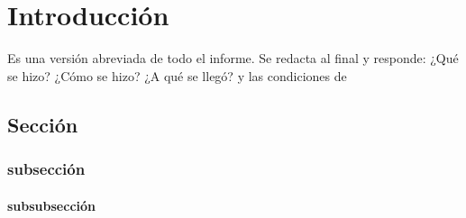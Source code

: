 \chapter{Introducción}
Es una versión abreviada de todo el informe. Se redacta al final y responde: ¿Qué se hizo? ¿Cómo se hizo? ¿A qué se llegó? y las condiciones de 
\section{Sección}
\subsection{subsección}
\subsubsection{subsubsección}